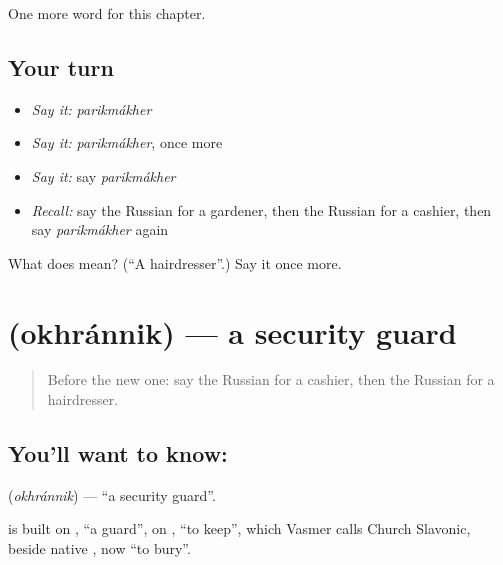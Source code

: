 \begin{grammarlens}[title={What you've built}]
One more word for this chapter.
\end{grammarlens}

\subsection*{Your turn}
\begin{itemize}
\raggedright
  \item \emph{Say it:} \emph{parikmákher}
  \item \emph{Say it:} \emph{parikmákher}, once more
  \item \emph{Say it:} say \emph{parikmákher}
  \item \emph{Recall:} say the Russian for a gardener, then the Russian for a cashier, then say \emph{parikmákher} again
\end{itemize}

\begin{tcolorbox}[breakable,colback=teal!4,colframe=teal!35!black,title={Before you move on}]
What does  mean? (\textquotedblleft{}A hairdresser\textquotedblright{}.) Say it once more.
\end{tcolorbox}
\section[\texorpdfstring{\ru{охранник} (okhránnik)}{охранник (okhránnik)}]{ (okhránnik) — a security guard}

\label{lesson:RU-C230-okhrannik}



\begin{quote}
Before the new one: say the Russian for a cashier, then the Russian for a hairdresser.
\end{quote}

\subsection*{You'll want to know: }
\textbf{} (\emph{okhránnik}) — \textquotedblleft{}a security guard\textquotedblright{}.

\begin{cousinweb}
\textbf{} is built on \emph{}, \textquotedblleft{}a guard\textquotedblright{}, on \emph{}, \textquotedblleft{}to keep\textquotedblright{}, which Vasmer calls Church Slavonic, beside native \emph{}, now \textquotedblleft{}to bury\textquotedblright{}.
\end{cousinweb}

